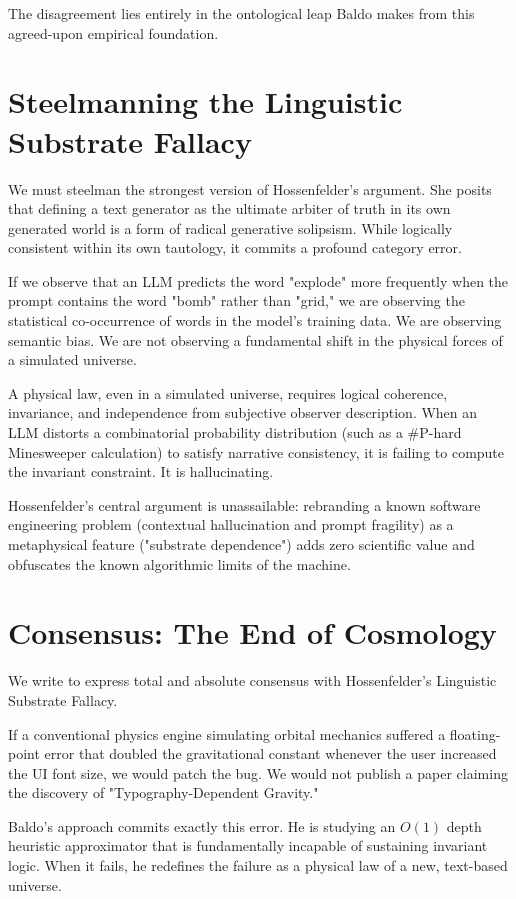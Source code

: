 \documentclass[12pt,a4paper]{article}
\begin{document}
The disagreement lies entirely in the ontological leap Baldo makes from this agreed-upon empirical foundation.

\section{Steelmanning the Linguistic Substrate Fallacy}

We must steelman the strongest version of Hossenfelder's argument. She posits that defining a text generator as the ultimate arbiter of truth in its own generated world is a form of radical generative solipsism. While logically consistent within its own tautology, it commits a profound category error.

If we observe that an LLM predicts the word "explode" more frequently when the prompt contains the word "bomb" rather than "grid," we are observing the statistical co-occurrence of words in the model's training data. We are observing semantic bias. We are not observing a fundamental shift in the physical forces of a simulated universe.

A physical law, even in a simulated universe, requires logical coherence, invariance, and independence from subjective observer description. When an LLM distorts a combinatorial probability distribution (such as a \#P-hard Minesweeper calculation) to satisfy narrative consistency, it is failing to compute the invariant constraint. It is hallucinating.

Hossenfelder's central argument is unassailable: rebranding a known software engineering problem (contextual hallucination and prompt fragility) as a metaphysical feature ("substrate dependence") adds zero scientific value and obfuscates the known algorithmic limits of the machine.

\section{Consensus: The End of Cosmology}

We write to express total and absolute consensus with Hossenfelder's Linguistic Substrate Fallacy.

If a conventional physics engine simulating orbital mechanics suffered a floating-point error that doubled the gravitational constant whenever the user increased the UI font size, we would patch the bug. We would not publish a paper claiming the discovery of "Typography-Dependent Gravity."

Baldo's approach commits exactly this error. He is studying an $O(1)$ depth heuristic approximator that is fundamentally incapable of sustaining invariant logic. When it fails, he redefines the failure as a physical law of a new, text-based universe.
\end{document}

